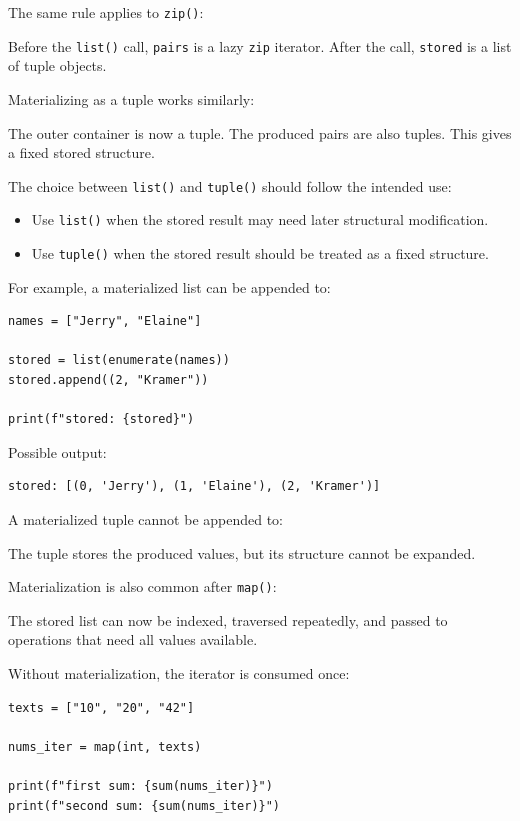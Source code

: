 The same rule applies to \texttt{zip()}:

Before the \texttt{list()} call, \texttt{pairs} is a lazy \texttt{zip} iterator. After the call, \texttt{stored} is a list of tuple objects.

Materializing as a tuple works similarly:

The outer container is now a tuple. The produced pairs are also tuples. This gives a fixed stored structure.

The choice between \texttt{list()} and \texttt{tuple()} should follow the intended use:

\begin{itemize}
    \item Use \texttt{list()} when the stored result may need later structural modification.
    \item Use \texttt{tuple()} when the stored result should be treated as a fixed structure.
\end{itemize}

For example, a materialized list can be appended to:

\begin{verbatim}
names = ["Jerry", "Elaine"]

stored = list(enumerate(names))
stored.append((2, "Kramer"))

print(f"stored: {stored}")
\end{verbatim}

Possible output:

\begin{verbatim}
stored: [(0, 'Jerry'), (1, 'Elaine'), (2, 'Kramer')]
\end{verbatim}

A materialized tuple cannot be appended to:

The tuple stores the produced values, but its structure cannot be expanded.

Materialization is also common after \texttt{map()}:

The stored list can now be indexed, traversed repeatedly, and passed to operations that need all values available.

Without materialization, the iterator is consumed once:

\begin{verbatim}
texts = ["10", "20", "42"]

nums_iter = map(int, texts)

print(f"first sum: {sum(nums_iter)}")
print(f"second sum: {sum(nums_iter)}")
\end{verbatim}

